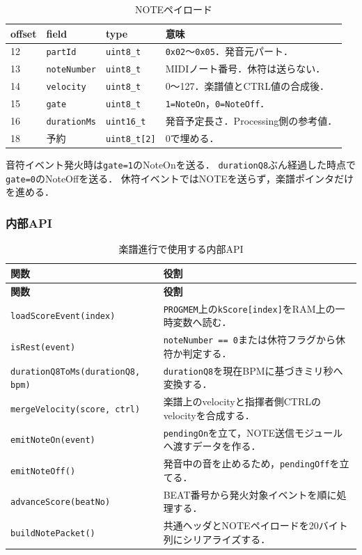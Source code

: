 \documentclass[lualatex,book,paper=a4paper,jafontsize=11.5pt,jafontscale=1.05]{jlreq}
\newcommand{\code}[1]{\texttt{#1}}
\begin{document}
\begin{table}[H]
\centering
\caption{NOTEペイロード}
\label{tab:note-payload}
\begin{tabular}{p{}p{}p{}p{}}
\toprule
\textbf{offset} & \textbf{field} & \textbf{type} & \textbf{意味} \\
\midrule
12 & \code{partId} & \code{uint8\_t} & \code{0x02}〜\code{0x05}．発音元パート．\\
13 & \code{noteNumber} & \code{uint8\_t} & MIDIノート番号．休符は送らない．\\
14 & \code{velocity} & \code{uint8\_t} & 0〜127．楽譜値とCTRL値の合成後．\\
15 & \code{gate} & \code{uint8\_t} & \code{1=NoteOn}，\code{0=NoteOff}．\\
16 & \code{durationMs} & \code{uint16\_t} & 発音予定長さ．Processing側の参考値．\\
18 & 予約 & \code{uint8\_t[2]} & 0で埋める．\\
\bottomrule
\end{tabular}
\end{table}

音符イベント発火時は\code{gate=1}のNoteOnを送る．
\code{durationQ8}ぶん経過した時点で\code{gate=0}のNoteOffを送る．
休符イベントではNOTEを送らず，楽譜ポインタだけを進める．

\subsubsection{内部API}

\begin{longtable}{p{}p{}}
\caption{楽譜進行で使用する内部API}\label{tab:api}\\
\toprule
\textbf{関数} & \textbf{役割} \\
\midrule
\endfirsthead
\toprule
\textbf{関数} & \textbf{役割} \\
\midrule
\endhead
\code{loadScoreEvent(index)} &
\code{PROGMEM}上の\code{kScore[index]}をRAM上の一時変数へ読む．\\
\code{isRest(event)} &
\code{noteNumber == 0}または休符フラグから休符か判定する．\\
\code{durationQ8ToMs(durationQ8, bpm)} &
\code{durationQ8}を現在BPMに基づきミリ秒へ変換する．\\
\code{mergeVelocity(score, ctrl)} &
楽譜上のvelocityと指揮者側CTRLのvelocityを合成する．\\
\code{emitNoteOn(event)} &
\code{pendingOn}を立て，NOTE送信モジュールへ渡すデータを作る．\\
\code{emitNoteOff()} &
発音中の音を止めるため，\code{pendingOff}を立てる．\\
\code{advanceScore(beatNo)} &
BEAT番号から発火対象イベントを順に処理する．\\
\code{buildNotePacket()} &
共通ヘッダとNOTEペイロードを20バイト列にシリアライズする．\\
\bottomrule
\end{longtable}
\end{document}
